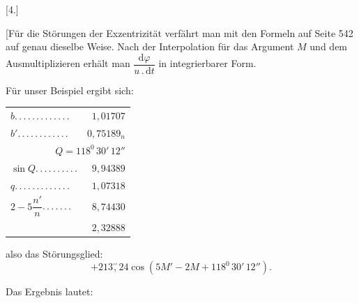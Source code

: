 \begin{landscape}
\begingroup
\fontsize{10}{13}\selectfont
{}
\renewcommand{\headrulewidth}{0pt}
\par\medskip
{}
\begin{center}[4.]\end{center}
\par\noindent\hspace*{\parindent}[Für die Störungen der Exzentrizität verfährt man mit den Formeln auf Seite 542 auf genau dieselbe Weise. Nach der Interpolation für das Argument \(M\) und dem Ausmultiplizieren erhält man \(\dfrac{\mathrm{d}\varphi}{u\mathbin{.}\mathrm{d}t}\) in integrierbarer Form.
\par\noindent\hspace*{\parindent}Für unser Beispiel ergibt sich:
\par
\begingroup\small
\noindent\begin{minipage}[c]{.43\textwidth}
\begin{tabular}{@{}lr@{}}
\(b\)\enspace .\,.\,.\,.\,.\,.\,.\,.\,.\,.\,.\,.\,.&\(1{,}01707\)\\
\(b'\)\enspace .\,.\,.\,.\,.\,.\,.\,.\,.\,.\,.\,.&\(0{,}75189_n\)\\
\multicolumn{2}{r}{\(Q=118^0\,30'\,12''\)}\\
\(\sin Q\)\enspace .\,.\,.\,.\,.\,.\,.\,.\,.\,.&\(9{,}94389\)\\
\(q\)\enspace .\,.\,.\,.\,.\,.\,.\,.\,.\,.\,.\,.\,.&\(1{,}07318\)\\
\(2-5\dfrac{n'}{n}\)\enspace .\,.\,.\,.\,.\,.\,.&\(8{,}74430\)\\
\hline
&\(2{,}32888\)
\end{tabular}
\end{minipage}\hfill
\begin{minipage}[c]{.55\textwidth}
also das Störungsglied:
\[
+213\overset{\prime\prime}{,}24\cos(5M'-2M+118^0\,30'\,12'').
\]
\end{minipage}\par
\endgroup
\clearpage
\endgroup
\end{landscape}
\begingroup
{}
\renewcommand{\headrulewidth}{0pt}
\par\noindent\hspace*{\parindent}Das Ergebnis lautet:
\begingroup\small
